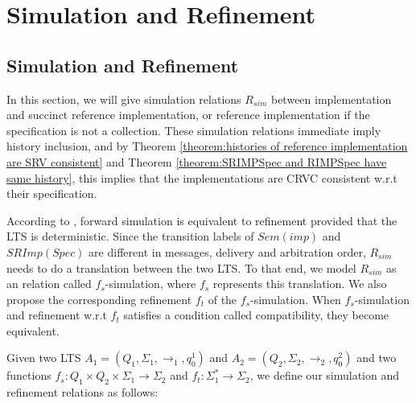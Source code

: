 
\section{Simulation and Refinement}
\label{sec:simulation and refinement}



\subsection{Simulation and Refinement}
\label{subsec:simulation and refinement}


In this section, we will give simulation relations $R_{\mathit{sim}}$ between implementation and succinct reference implementation, or reference implementation if the specification is not a collection. These simulation relations immediate imply history inclusion, and by Theorem \ref{theorem:histories of reference implementation are SRV consistent} and Theorem \ref{theorem:SRIMPSpec and RIMPSpec have same history}, this implies that the implementations are CRVC consistent w.r.t their specification.

According to \cite{Abadi:1991,Lynch:1995}, forward simulation is equivalent to refinement provided that the  LTS is deterministic. Since the transition labels of $\mathit{Sem}(\mathit{imp})$ and $\mathit{SRImp}(\mathit{Spec})$ are different in messages, delivery and arbitration order, $R_{\mathit{sim}}$ needs to do a translation between the two LTS. To that end, we model $R_{\mathit{sim}}$ as an relation called $f_s$-simulation, where $f_s$ represents this translation. We also propose the corresponding refinement $f_t$ of the $f_s$-simulation. When $f_s$-simulation and refinement w.r.t $f_t$ satisfies a condition called compatibility, they become equivalent.

Given two LTS $A_1 = (Q_1,\Sigma_1,\rightarrow_1,q_{0}^1)$ and $A_2 = (Q_2,\Sigma_2,\rightarrow_2,q_{0}^2)$ and two functions $f_s: Q_1 \times Q_2 \times \Sigma_1 \rightarrow \Sigma_2$ and $f_t:\Sigma_1^* \rightarrow \Sigma_2$, we define our simulation and refinement relations as follows:


